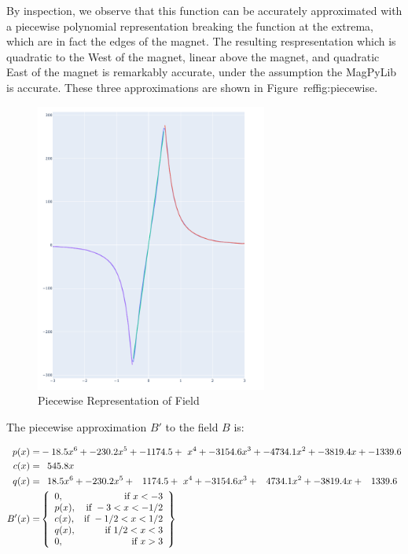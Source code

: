 \documentclass[]{asme2ej}
\begin{document}
By inspection, we observe that this function can be accurately approximated with
a piecewise polynomial representation breaking the function at the extrema, which
are in fact the edges of the magnet. The resulting respresentation which is quadratic
to the West of the magnet, linear above the magnet, and quadratic East of the magnet
is remarkably accurate, under the assumption the MagPyLib is accurate. These
three approximations are shown in Figure~ref{fig:piecewise}.

\begin{figure}
\centerline{\includegraphics[width=3in]{figure/PlotOfBxWithPieceWiseInterpolation.png}}
\caption{Piecewise Representation of Field}
\label{fig:piecewise}
\end{figure}

The piecewise approximation $B'$ to the field $B$ is:

\begin{align}
  p(x) = & -18.5 x^6 + -230.2 x^5 + -1174.5 + \
  x^4 + -3154.6 x^3 + -4734.1 x^2 + -3819.4x + -1339.6 \\
  c(x) = & \hphantom{-}545.8 x \\
  q(x) = &  \hphantom{-}18.5 x^6 + -230.2 x^5 + \hphantom{-} 1174.5 + \
  x^4 + -3154.6x^3 +  \hphantom{-} 4734.1x^2 + -3819.4x + \hphantom{-} 1339.6 \\
B'(x) = &
\left\{
    \begin{array}{lr}
      0 , & \text{if } x < -3 \\
      p(x) , & \text{if } -3 < x  < -1/2 \\
      c(x) , & \text{if } -1/2 < x < 1/2 \\
      q(x) , & \text{if } 1/2 < x < 3 \\
      0 , & \text{if } x > 3
    \end{array}
    \right\}
    \label{eq:Bfield}
\end{align}
\end{document}
